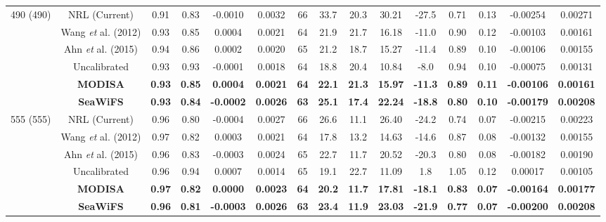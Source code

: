 \documentclass[preview]{standalone}
\begin{document}
\begin{tabular}{ccccccccccccccc}
\multirow{6}{*}{490 (490)} 	& NRL (Current) 			& 0.91 & 0.83 & -0.0010 & 0.0032 & 66 & 33.7 & 20.3 & 30.21 & -27.5 & 0.71 & 0.13 & -0.00254 & 0.00271 \\
							& Wang {\it et} al. (2012) 	& 0.93 & 0.85 & 0.0004 & 0.0021 & 64 & 21.9 & 21.7 & 16.18 & -11.0 & 0.90 & 0.12 & -0.00103 & 0.00161 \\
							& Ahn {\it et} al. (2015) 	& 0.94 & 0.86 & 0.0002 & 0.0020 & 65 & 21.2 & 18.7 & 15.27 & -11.4 & 0.89 & 0.10 & -0.00106 & 0.00155 \\
							& Uncalibrated 				& 0.93 & 0.93 & -0.0001 & 0.0018 & 64 & 18.8 & 20.4 & 10.84 & -8.0 & 0.94 & 0.10 & -0.00075 & 0.00131 \\
							& {\bf MODISA} 				& {\bf 0.93} & {\bf 0.85} & {\bf 0.0004} & {\bf 0.0021} & {\bf 64} & {\bf 22.1} & {\bf 21.3} & {\bf 15.97} & {\bf -11.3} & {\bf 0.89} & {\bf 0.11} & {\bf -0.00106} & {\bf 0.00161} \\
							& {\bf SeaWiFS} 			& {\bf 0.93} & {\bf 0.84} & {\bf -0.0002} & {\bf 0.0026} & {\bf 63} & {\bf 25.1} & {\bf 17.4} & {\bf 22.24} & {\bf -18.8} & {\bf 0.80} & {\bf 0.10} & {\bf -0.00179} & {\bf 0.00208} \\ \hline

\multirow{6}{*}{555 (555)} 	& NRL (Current) 			& 0.96 & 0.80 & -0.0004 & 0.0027 & 66 & 26.6 & 11.1 & 26.40 & -24.2 & 0.74 & 0.07 & -0.00215 & 0.00223 \\
							& Wang {\it et} al. (2012) 	& 0.97 & 0.82 & 0.0003 & 0.0021 & 64 & 17.8 & 13.2 & 14.63 & -14.6 & 0.87 & 0.08 & -0.00132 & 0.00155 \\
							& Ahn {\it et} al. (2015) 	& 0.96 & 0.83 & -0.0003 & 0.0024 & 65 & 22.7 & 11.7 & 20.52 & -20.3 & 0.80 & 0.08 & -0.00182 & 0.00190 \\
							& Uncalibrated 				& 0.96 & 0.94 & 0.0007 & 0.0014 & 65 & 19.1 & 22.7 & 11.09 & 1.8 & 1.05 & 0.12 & 0.00017 & 0.00105 \\
							& {\bf MODISA} 				& {\bf 0.97} & {\bf 0.82} & {\bf 0.0000} & {\bf 0.0023} & {\bf 64} & {\bf 20.2} & {\bf 11.7} & {\bf 17.81} & {\bf -18.1} & {\bf 0.83} & {\bf 0.07} & {\bf -0.00164} & {\bf 0.00177} \\
							& {\bf SeaWiFS} 			& {\bf 0.96} & {\bf 0.81} & {\bf -0.0003} & {\bf 0.0026} & {\bf 63} & {\bf 23.4} & {\bf 11.9} & {\bf 23.03} & {\bf -21.9} & {\bf 0.77} & {\bf 0.07} & {\bf -0.00200} & {\bf 0.00208} \\ \hline


\end{tabular}
\end{document}
